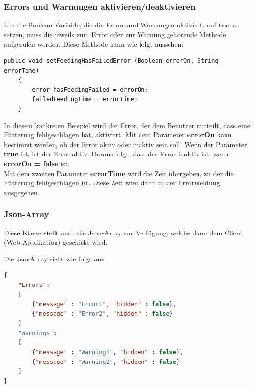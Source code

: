 \subsubsection{Errors und Warnungen aktivieren/deaktivieren}
Um die Boolean-Variable, die die Errors and Warnungen aktiviert, auf true zu setzen, muss die jeweils zum Error oder zur Warnung gehörende Methode aufgerufen werden. Diese Methode kann wie folgt aussehen:
\begin{lstlisting}[style=JavaStyle, caption=Error setzen]
public void setFeedingHasFailedError (Boolean errorOn, String errorTime)
    {
        error_hasFeedingFailed = errorOn;
        failedFeedingTime = errorTime;
    }
\end{lstlisting}
In diesem konkreten Beispiel wird der Error, der dem Benutzer mitteilt, dass eine Fütterung fehlgeschlagen hat, aktiviert. Mit dem Parameter \textbf{errorOn} kann bestimmt werden, ob der Error aktiv oder inaktiv sein soll. Wenn der Parameter \textbf{true} ist, ist der Error aktiv. Daraus folgt, dass der Error inaktiv ist, wenn \textbf{errorOn = false} ist. 
\\ Mit dem zweiten Parameter \textbf{errorTime} wird die Zeit übergeben, zu der die Fütterung fehlgeschlagen ist. Diese Zeit wird dann in der Errormeldung ausgegeben. 

\subsubsection{Json-Array} \label{subsubsec:Array}
Diese Klasse stellt auch die Json-Array zur Verfügung, welche dann dem Client (Web-Applikation) geschickt wird. 

Die JsonArray sieht wie folgt aus:

\begin{lstlisting}[language=json,firstnumber=1, caption=Json-Objekt mit Errors und Warnungen]
{ 
	"Errors": 
	[ 
		{"message" : "Error1", "hidden" : false}, 
		{"message" : "Error2", "hidden" : false} 
	] 
	"Warnings": 
	[ 
		{"message" : "Warning1", "hidden" : false}, 
		{"message" : "Warning2", "hidden" : false} 
	] 
} 
\end{lstlisting}

\newpage

